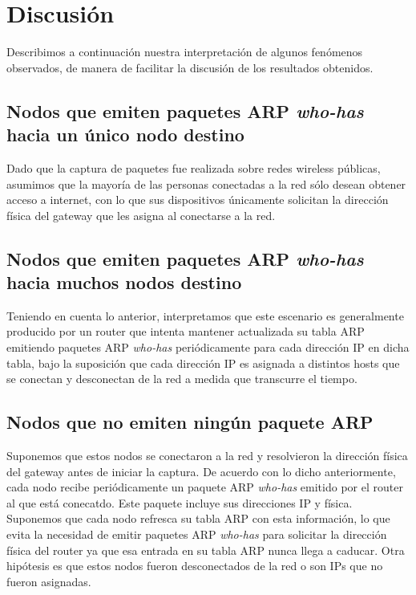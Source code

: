 \documentclass[10pt, a4paper]{article}
\begin{document}
\section{Discusión}
Describimos a continuación nuestra interpretación de algunos fenómenos observados, de manera de facilitar la discusión de los resultados obtenidos.

\subsection{Nodos que emiten paquetes ARP \textit{who-has} hacia un único nodo destino}

Dado que la captura de paquetes fue realizada sobre redes wireless públicas, asumimos que la mayoría de las personas conectadas a la red sólo desean obtener acceso a internet, con lo que sus dispositivos únicamente solicitan la dirección física del gateway que les asigna al conectarse a la red.


\subsection{Nodos que emiten paquetes ARP \textit{who-has} hacia muchos nodos destino}

Teniendo en cuenta lo anterior, interpretamos que este escenario es generalmente producido por un router que intenta mantener actualizada su tabla ARP emitiendo paquetes ARP \textit{who-has} periódicamente para cada dirección IP en dicha tabla, bajo la suposición que cada dirección IP es asignada a distintos hosts que se conectan y desconectan de la red a medida que transcurre el tiempo.


\subsection{Nodos que no emiten ningún paquete ARP}

Suponemos que estos nodos se conectaron a la red y resolvieron la dirección física del gateway antes de iniciar la captura. De acuerdo con lo dicho anteriormente, cada nodo recibe periódicamente un paquete ARP \textit{who-has} emitido por el router al que está conecatdo. Este paquete incluye sus direcciones IP y física. Suponemos que cada nodo refresca su tabla ARP con esta información, lo que evita la necesidad de emitir paquetes ARP \textit{who-has} para solicitar la dirección física del router ya que esa entrada en su tabla ARP nunca llega a caducar.
Otra hipótesis es que estos nodos fueron desconectados de la red o son IPs que no fueron asignadas.
\end{document}
